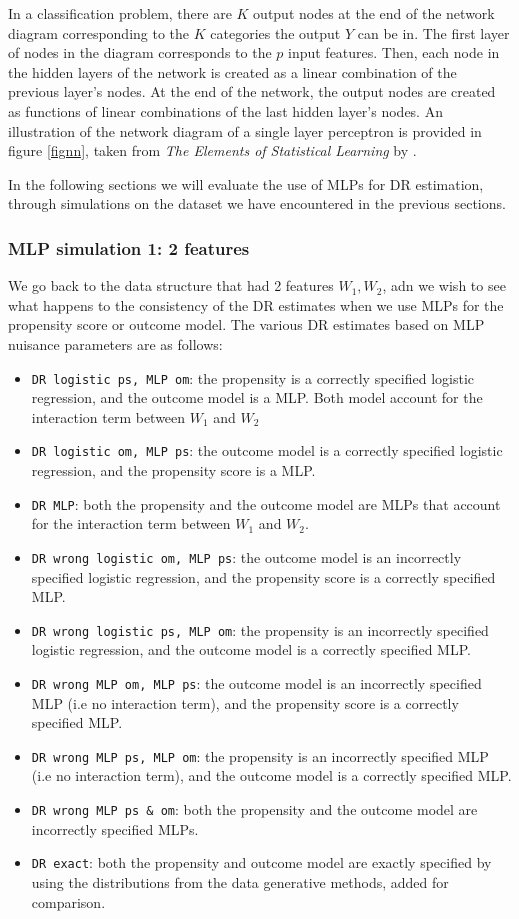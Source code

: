 \documentclass[12pt,twoside]{article}
\begin{document}
In a classification problem, there are $K$ output nodes at the end of the network diagram corresponding to the $K$ categories the output $Y$ can be in. The first layer of nodes in the diagram corresponds to the $p$ input features. Then, each node in the hidden layers of the network is created as a linear combination of the previous layer's nodes. At the end of the network, the output nodes are created as functions of linear combinations of the last hidden layer's nodes. An illustration of the network diagram of a single layer perceptron is provided in figure \ref{fignn}, taken from \textit{The Elements of Statistical Learning} by \citet{hastieESL}.

In the following sections we will evaluate the use of MLPs for DR estimation, through simulations on the dataset we have encountered in the previous sections.

\subsubsection{MLP simulation 1: 2 features}

We go back to the data structure that had 2 features $W_1,W_2$, adn we wish to see what happens to the consistency of the DR estimates when we use MLPs for the propensity score or outcome model. The various DR estimates based on MLP nuisance parameters are as follows: 
\begin{itemize}
    \item \texttt{DR logistic ps, MLP om}: the propensity is a correctly specified logistic regression, and the outcome model is a MLP. Both model account for the interaction term between $W_1$ and $W_2$
    \item \texttt{DR logistic om, MLP ps}: the outcome model is a correctly specified logistic regression, and the propensity score is a MLP.
    \item \texttt{DR MLP}: both the propensity and the outcome model are MLPs that account for the interaction term between $W_1$ and $W_2$.
    \item \texttt{DR wrong logistic om, MLP ps}: the outcome model is an incorrectly specified logistic regression, and the propensity score is a correctly specified MLP.
    \item \texttt{DR wrong logistic ps, MLP om}: the propensity is an incorrectly specified logistic regression, and the outcome model is a correctly specified MLP.
    \item \texttt{DR wrong MLP om, MLP ps}: the outcome model is an incorrectly specified MLP (i.e no interaction term), and the propensity score is a correctly specified MLP.
    \item \texttt{DR wrong MLP ps, MLP om}: the propensity is an incorrectly specified MLP (i.e no interaction term), and the outcome model is a correctly specified MLP.
    \item \texttt{DR wrong MLP ps \& om}: both the propensity and the outcome model are incorrectly specified MLPs.
    \item \texttt{DR exact}: both the propensity and outcome model are exactly specified by using the distributions from the data generative methods, added for comparison.
\end{itemize}
\end{document}
